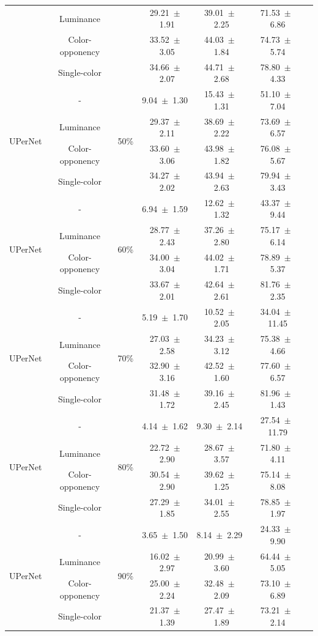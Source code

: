 \begin{table}[h]
\begin{tabular}{@{}lccc ccc@{}}
& Luminance & & 29.21~$\pm$~1.91 & 39.01~$\pm$~2.25 & 71.53~$\pm$~6.86 \\
& Color-opponency & & 33.52~$\pm$~3.05 & 44.03~$\pm$~1.84 & 74.73~$\pm$~5.74 \\
& Single-color & & 34.66~$\pm$~2.07 & 44.71~$\pm$~2.68 & 78.80~$\pm$~4.33 \\
\midrule
\multirow{4}{*}{UPerNet} & - & \multirow{4}{*}{50\%} & 9.04~$\pm$~1.30 & 15.43~$\pm$~1.31 & 51.10~$\pm$~7.04 \\
& Luminance & & 29.37~$\pm$~2.11 & 38.69~$\pm$~2.22 & 73.69~$\pm$~6.57 \\
& Color-opponency & & 33.60~$\pm$~3.06 & 43.98~$\pm$~1.82 & 76.08~$\pm$~5.67 \\
& Single-color & & 34.27~$\pm$~2.02 & 43.94~$\pm$~2.63 & 79.94~$\pm$~3.43 \\
\midrule
\multirow{4}{*}{UPerNet} & - & \multirow{4}{*}{60\%} & 6.94~$\pm$~1.59 & 12.62~$\pm$~1.32 & 43.37~$\pm$~9.44 \\
& Luminance & & 28.77~$\pm$~2.43 & 37.26~$\pm$~2.80 & 75.17~$\pm$~6.14 \\
& Color-opponency & & 34.00~$\pm$~3.04 & 44.02~$\pm$~1.71 & 78.89~$\pm$~5.37 \\
& Single-color & & 33.67~$\pm$~2.01 & 42.64~$\pm$~2.61 & 81.76~$\pm$~2.35 \\
\midrule
\multirow{4}{*}{UPerNet} & - & \multirow{4}{*}{70\%} & 5.19~$\pm$~1.70 & 10.52~$\pm$~2.05 & 34.04~$\pm$~11.45 \\
& Luminance & & 27.03~$\pm$~2.58 & 34.23~$\pm$~3.12 & 75.38~$\pm$~4.66 \\
& Color-opponency & & 32.90~$\pm$~3.16 & 42.52~$\pm$~1.60 & 77.60~$\pm$~6.57 \\
& Single-color & & 31.48~$\pm$~1.72 & 39.16~$\pm$~2.45 & 81.96~$\pm$~1.43 \\
\midrule
\multirow{4}{*}{UPerNet} & - & \multirow{4}{*}{80\%} & 4.14~$\pm$~1.62 & 9.30~$\pm$~2.14 & 27.54~$\pm$~11.79 \\
& Luminance & & 22.72~$\pm$~2.90 & 28.67~$\pm$~3.57 & 71.80~$\pm$~4.11 \\
& Color-opponency & & 30.54~$\pm$~2.90 & 39.62~$\pm$~1.25 & 75.14~$\pm$~8.08 \\
& Single-color & & 27.29~$\pm$~1.85 & 34.01~$\pm$~2.55 & 78.85~$\pm$~1.97 \\
\midrule
\multirow{4}{*}{UPerNet} & - & \multirow{4}{*}{90\%} & 3.65~$\pm$~1.50 & 8.14~$\pm$~2.29 & 24.33~$\pm$~9.90 \\
& Luminance & & 16.02~$\pm$~2.97 & 20.99~$\pm$~3.60 & 64.44~$\pm$~5.05 \\
& Color-opponency & & 25.00~$\pm$~2.24 & 32.48~$\pm$~2.09 & 73.10~$\pm$~6.89 \\
& Single-color & & 21.37~$\pm$~1.39 & 27.47~$\pm$~1.89 & 73.21~$\pm$~2.14 \\
\midrule
\bottomrule
\end{tabular}
\label{tab:sparse_results_upernet_acdc_rain}
\end{table}